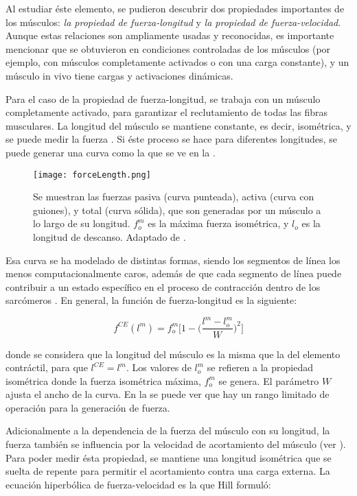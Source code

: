 Al estudiar éste elemento, se pudieron descubrir dos propiedades importantes de los músculos: \textit{la propiedad de fuerza-longitud} y \textit{la propiedad de fuerza-velocidad}. Aunque estas relaciones son ampliamente usadas y reconocidas, es importante mencionar que se obtuvieron en condiciones controladas de los músculos (por ejemplo, con músculos completamente activados o con una carga constante), y un músculo in vivo tiene cargas y activaciones dinámicas.

Para el caso de la propiedad de fuerza-longitud, se trabaja con un músculo completamente activado, para garantizar el reclutamiento de todas las fibras musculares. La longitud del músculo se mantiene constante, es decir, isométrica, y se puede medir la fuerza \citep{biomechanics2007herzog}. Si éste proceso se hace para diferentes longitudes, se puede generar una curva como la que se ve en la .

\begin{figure}[!ht]
	\centering
		\texttt{[image: forceLength.png]}
	\caption[Curva de fuerza-longitud.]{Se muestran las fuerzas pasiva (curva punteada), activa (curva con guiones), y total (curva sólida), que son generadas por un músculo a lo largo de su longitud. $f_o^m$ es la máxima fuerza isométrica, y $l_o$ es la longitud de descanso. Adaptado de \citep{zajac1989muscle, lee2010survey}.}
	\label{fig:forceLength}
\end{figure}

Esa curva se ha modelado de distintas formas, siendo los segmentos de línea \citep{zajac1989muscle} los menos computacionalmente caros, además de que cada segmento de línea puede contribuir a un estado específico en el proceso de contracción dentro de los sarcómeros \citep{biomechanics2007herzog}. En general, la función de fuerza-longitud es la siguiente:

\begin{equation}
	f^{CE}(l^m) = f_o^m \Bigg[ 1 - \Bigg(\frac{l^m-l_o^m}{W} \Bigg)^2\Bigg]
\end{equation}

donde se considera que la longitud del músculo es la misma que la del elemento contráctil, para que $l^{CE} = l^m$. Los valores de $l_o^m$ se refieren a la propiedad isométrica donde la fuerza isométrica máxima, $f_o^m$ se genera. El parámetro $W$ ajusta el ancho de la curva. En la  se puede ver que hay un rango limitado de operación para la generación de fuerza.

Adicionalmente a la dependencia de la fuerza del músculo con su longitud, la fuerza también se influencia por la velocidad de acortamiento del músculo (ver ). Para poder medir ésta propiedad, se mantiene una longitud isométrica que se suelta de repente para permitir el acortamiento contra una carga externa. La ecuación hiperbólica de fuerza-velocidad es la que Hill \citep{hill1970first} formuló:

